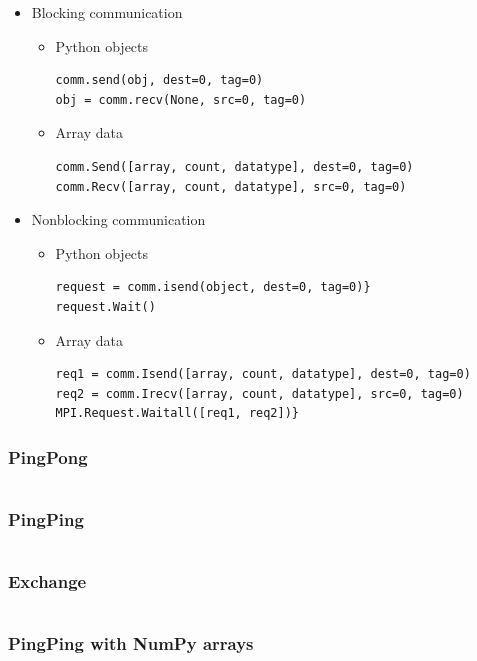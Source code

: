 \documentclass{beamer}
\begin{document}
\begin{frame}[fragile]
  \begin{itemize}
  \item Blocking communication
    \begin{itemize}
    \item Python objects
      {\footnotesize
\begin{verbatim}
comm.send(obj, dest=0, tag=0)
obj = comm.recv(None, src=0, tag=0)
\end{verbatim}
      }
    \item Array data
      {\footnotesize
\begin{verbatim}
comm.Send([array, count, datatype], dest=0, tag=0)
comm.Recv([array, count, datatype], src=0, tag=0)
\end{verbatim}
      }
    \end{itemize}
  \item Nonblocking communication
    \begin{itemize}
    \item Python objects
      {\footnotesize
\begin{verbatim}
request = comm.isend(object, dest=0, tag=0)}
request.Wait()
\end{verbatim}
      }
    \item Array data
      {\footnotesize
\begin{verbatim}
req1 = comm.Isend([array, count, datatype], dest=0, tag=0)
req2 = comm.Irecv([array, count, datatype], src=0, tag=0)
MPI.Request.Waitall([req1, req2])}
\end{verbatim}
      }
    \end{itemize}
  \end{itemize}
\end{frame}

\begin{frame}
  \frametitle{PingPong}
  \inputminted[linenos]{python}{p2p_pingpong.py}
\end{frame}

\begin{frame}
  \frametitle{PingPing}
  \inputminted[linenos]{python}{p2p_pingping.py}
\end{frame}

\begin{frame}
  \frametitle{Exchange}
  \inputminted[linenos]{python}{p2p_exchange.py}
\end{frame}

\begin{frame}
  \frametitle{PingPing with NumPy arrays}
  \inputminted[linenos]{python}{p2p_pingping-numpy.py}
\end{frame}
\end{document}
